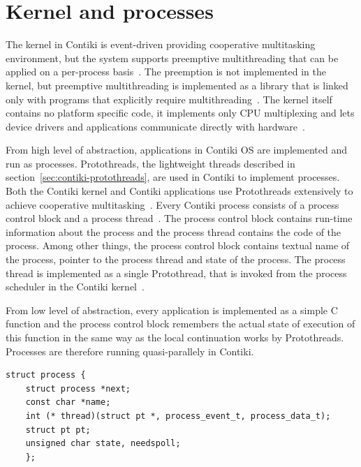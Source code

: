 
\section{Kernel and processes}\label{sec:contiki-kernel}
The kernel in Contiki is event-driven providing cooperative multitasking
environment, but the system supports preemptive
multithreading that can be applied on a per-process basis~\cite{video}.
The preemption is not implemented in the kernel, but
preemptive multithreading is implemented as a library that is linked only with programs that
explicitly require multithreading~\cite{paper-contiki}.
The kernel itself contains no platform specific code, it implements only CPU multiplexing and
lets device drivers and applications communicate directly with hardware~\cite{video}.

From high level of abstraction,
applications in Contiki OS are implemented and run as processes.
Protothreads, the lightweight threads described in section~\ref{sec:contiki-protothreads},
are used in Contiki to implement processes.
Both the Contiki kernel and Contiki applications use
Protothreads extensively to achieve cooperative multitasking~\cite{contiki-wiki-faq}.
Every Contiki process consists of a process control block and a process thread~\cite{contiki-wiki-processes}.
The process control block contains run-time information about the process and
the process thread contains the code of the process.
Among other things, the process control block contains
textual name of the process, pointer to the process thread and state of the process.
The process thread is implemented as a single Protothread,
that is invoked from the process scheduler in the Contiki kernel~\cite{contiki-wiki-processes}.

From low level of abstraction,
every application is implemented as a simple C function
and the process control block remembers the actual state of execution of this function
in the same way as the local continuation works by Protothreads.
Processes are therefore running quasi-parallely in Contiki.

\bigskip
\begin{lstlisting}[caption=Process control block in Contiki OS]
struct process {
	struct process *next;
	const char *name;
	int (* thread)(struct pt *, process_event_t, process_data_t);
	struct pt pt;
	unsigned char state, needspoll;
	};
\end{lstlisting}

